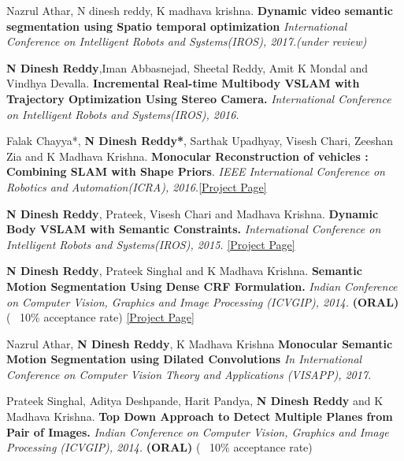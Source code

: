 \documentclass[a4paper,10pt]{article}
\begin{document}
\vspace{-2 mm}
Nazrul Athar, N dinesh reddy, K madhava krishna. \textbf{Dynamic video semantic segmentation using Spatio temporal
      optimization} {\sl International Conference on Intelligent Robots and Systems(IROS), 2017.(under review)}


\textbf{N Dinesh Reddy},Iman Abbasnejad, Sheetal Reddy,  Amit K Mondal and Vindhya Devalla. \textbf{Incremental Real-time Multibody VSLAM with Trajectory Optimization Using Stereo Camera.} {\sl International Conference on Intelligent Robots and Systems(IROS), 2016.}


Falak Chayya*, \textbf{N Dinesh Reddy*}, Sarthak Upadhyay, Visesh Chari, Zeeshan Zia and K Madhava Krishna. \textbf{Monocular Reconstruction of vehicles : Combining SLAM with Shape Priors}. {\sl IEEE International Conference on Robotics and Automation(ICRA), 2016.}\href{http://robotics.iiit.ac.in/people/falak.chhaya/Monocular_Reconstruction_of_Vehicles.html}{[Project Page]}


\textbf{N Dinesh Reddy}, Prateek, Visesh Chari and Madhava Krishna. \textbf{Dynamic Body VSLAM with Semantic Constraints.} {\sl International Conference on Intelligent Robots and Systems(IROS), 2015.} \href{https://researchweb.iiit.ac.in/~dineshreddy.n/zerotype/projects/DB-VSLAM/}{[Project Page]}


\textbf{N Dinesh Reddy}, Prateek Singhal and K Madhava Krishna. \textbf{Semantic Motion Segmentation Using Dense CRF Formulation.} {\sl Indian Conference on Computer Vision, Graphics and Image Processing (ICVGIP), 2014.} \textbf{(ORAL)} (~ 10\% acceptance rate) \href{https://researchweb.iiit.ac.in/~dineshreddy.n/zerotype/projects/SMS/} {[Project Page]}
 
  Nazrul Athar, \textbf{N Dinesh Reddy}, K Madhava Krishna \textbf{Monocular Semantic Motion Segmentation using Dilated
Convolutions} {\sl In  International Conference on Computer Vision Theory and Applications (VISAPP), 2017.}

 Prateek Singhal, Aditya Deshpande, Harit Pandya, \textbf{N Dinesh Reddy} and K Madhava Krishna. \textbf{Top Down Approach to Detect Multiple Planes from Pair of Images.} {\sl Indian Conference on Computer Vision, Graphics and Image Processing (ICVGIP), 2014.} \textbf{(ORAL)}  (~ 10\% acceptance rate)
 
\newpage
 
\end{document}
